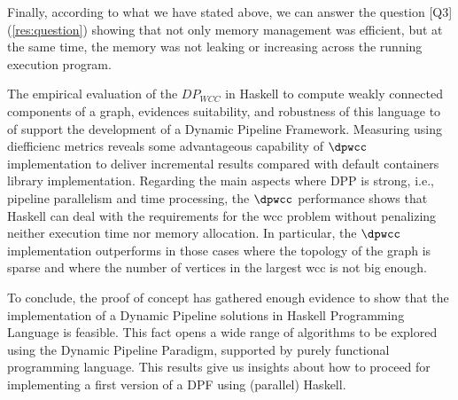 Finally, according to what we have stated above, we can answer the question [Q3] (\autoref{res:question}) showing that not only memory management was efficient, but at the same time, the memory was not leaking or increasing across the running execution program.

The empirical evaluation of the $DP_{WCC}$ in Haskell to compute weakly connected components of a graph, evidences  suitability, and robustness of this  language to of  support the development of a Dynamic Pipeline Framework. Measuring using diefficienc metrics reveals some advantageous capability of $\dpwcc$ implementation to deliver incremental results compared with default containers library implementation.  Regarding the main aspects where DPP is strong, i.e., pipeline parallelism and time processing, the $\dpwcc$ performance shows that Haskell can deal with the requirements for the \acrshort{wcc} problem without penalizing neither execution time nor memory allocation. In particular, the $\dpwcc$ implementation outperforms in those cases where the topology of the graph is sparse and where the number of vertices in the largest \acrshort{wcc} is not big enough.  

To conclude, the proof of concept has gathered enough evidence to show that the implementation of a Dynamic Pipeline solutions in Haskell Programming Language is feasible. This fact opens a wide range of algorithms to be explored using the Dynamic Pipeline Paradigm, supported by purely functional programming language. This results give us insights about how to proceed for implementing a first version of a DPF using (parallel) Haskell.